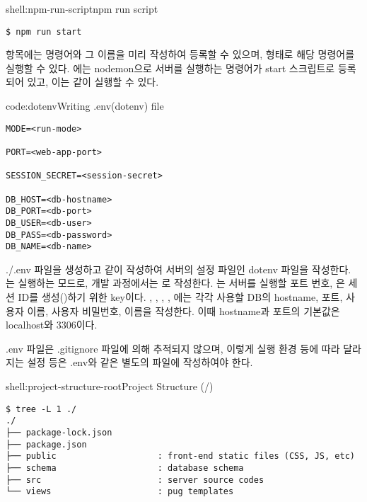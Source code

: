 \begin{shellenv}{shell:npm-run-script}{npm run script}\begin{verbatim}
$ npm run start
\end{verbatim}
\end{shellenv}

 항목에는 명령어와 그 이름을 미리 작성하여 등록할 수 있으며,  형태로 해당 명령어를 실행할 수 있다. 에는 nodemon으로 서버를 실행하는 명령어가 start 스크립트로 등록되어 있고, 이는 \와 같이 실행할 수 있다.

\begin{codeenv}{code:dotenv}{Writing .env(dotenv) file}\begin{verbatim}
MODE=<run-mode>

PORT=<web-app-port>

SESSION_SECRET=<session-secret>

DB_HOST=<db-hostname>
DB_PORT=<db-port>
DB_USER=<db-user>
DB_PASS=<db-password>
DB_NAME=<db-name>
\end{verbatim}
\end{codeenv}

./.env 파일을 생성하고 \와 같이 작성하여 서버의 설정 파일인 dotenv 파일을 작성한다. 는 실행하는 모드로, 개발 과정에서는 로 작성한다. 는 서버를 실행할 포트 번호, 은 세션 ID를 생성()하기 위한 key이다. , , , , 에는 각각 사용할 DB의 hostname, 포트, 사용자 이름, 사용자 비밀번호, 이름을 작성한다. 이때 hostname과 포트의 기본값은 localhost와 3306이다.

.env 파일은 .gitignore 파일에 의해 추적되지 않으며, 이렇게 실행 환경 등에 따라 달라지는 설정 등은 .env와 같은 별도의 파일에 작성하여야 한다.

\begin{shellenv}{shell:project-structure-root}{Project Structure (/)}\begin{verbatim}
$ tree -L 1 ./
./
├── package-lock.json
├── package.json
├── public                    : front-end static files (CSS, JS, etc)
├── schema                    : database schema
├── src                       : server source codes
└── views                     : pug templates
\end{verbatim}
\end{shellenv}

